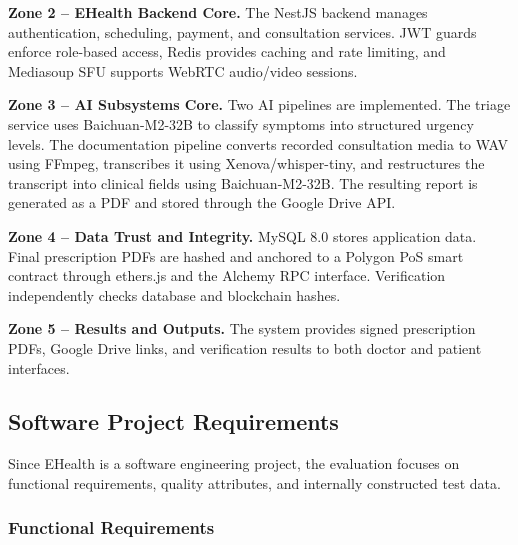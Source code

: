 \noindent\textbf{Zone 2 -- EHealth Backend Core.}
The NestJS backend manages authentication, scheduling, payment, and consultation services. JWT guards enforce role-based access, Redis provides caching and rate limiting, and Mediasoup SFU supports WebRTC audio/video sessions.

\noindent\textbf{Zone 3 -- AI Subsystems Core.}
Two AI pipelines are implemented. The triage service uses Baichuan-M2-32B to classify symptoms into structured urgency levels. The documentation pipeline converts recorded consultation media to WAV using FFmpeg, transcribes it using Xenova/whisper-tiny, and restructures the transcript into clinical fields using Baichuan-M2-32B. The resulting report is generated as a PDF and stored through the Google Drive API.

\noindent\textbf{Zone 4 -- Data Trust and Integrity.}
MySQL 8.0 stores application data. Final prescription PDFs are hashed and anchored to a Polygon PoS smart contract through ethers.js and the Alchemy RPC interface. Verification independently checks database and blockchain hashes.

\noindent\textbf{Zone 5 -- Results and Outputs.}
The system provides signed prescription PDFs, Google Drive links, and verification results to both doctor and patient interfaces.

\cleardoublepage

\subsection{Software Project Requirements}

Since EHealth is a software engineering project, the evaluation focuses on functional requirements, quality attributes, and internally constructed test data.

\subsubsection{Functional Requirements}


